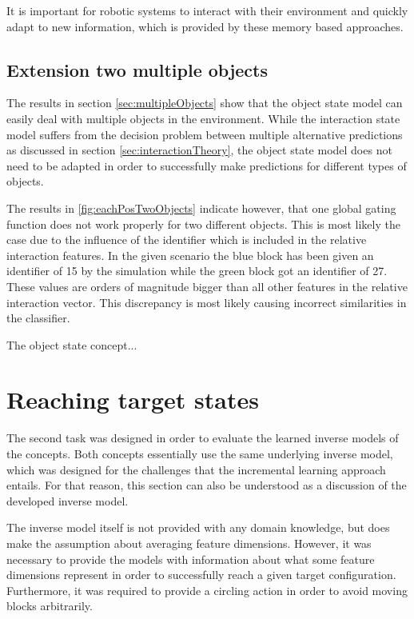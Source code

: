 It is important for robotic systems to interact with their environment and quickly adapt to new information, which is provided by these memory based approaches.

\subsection{Extension two multiple objects}

The results in section \ref{sec:multipleObjects} show that the object state model can easily deal with multiple objects in the environment. While the interaction state model suffers from the decision problem between multiple alternative predictions as discussed in section \ref{sec:interactionTheory}, the object state model does not need to be adapted in order to successfully make predictions for different types of objects. 

The results in \ref{fig:eachPosTwoObjects} indicate however, that one global gating function does not work properly for two different objects. This is most likely the case due to the influence of the identifier which is included in the relative interaction features. In the given scenario the blue block has been given an identifier of 15 by the simulation while the green block got an identifier of 27. These values are orders of magnitude bigger than all other features in the relative interaction vector. This discrepancy is most likely causing incorrect similarities in the classifier.

The object state concept...

\section{Reaching target states}

The second task was designed in order to evaluate the learned inverse models of the concepts. Both concepts essentially use the same underlying inverse model, which was designed for the challenges that the incremental learning approach entails. 
For that reason, this section can also be understood as a discussion of the developed inverse model.

The inverse model itself is not provided with any domain knowledge, but does make the assumption about averaging feature dimensions. 
However, it was necessary to provide the models with information about what some feature dimensions represent in order to successfully reach a given target configuration. 
Furthermore, it was required to provide a circling action in order to avoid moving blocks arbitrarily.

